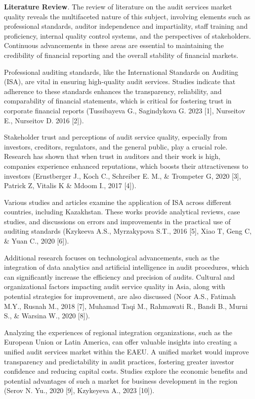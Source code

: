 \begin{multicols}{2}
\textbf{Literature Review}\emph{.} The review of literature on the audit
services market quality reveals the multifaceted nature of this subject,
involving elements such as professional standards, auditor independence
and impartiality, staff training and proficiency, internal quality
control systems, and the perspectives of stakeholders. Continuous
advancements in these areas are essential to maintaining the credibility
of financial reporting and the overall stability of financial markets.

Professional auditing standards, like the International Standards on
Auditing (ISA), are vital in ensuring high-quality audit services.
Studies indicate that adherence to these standards enhances the
transparency, reliability, and comparability of financial statements,
which is critical for fostering trust in corporate financial reports
(Tussibayeva G., Sagindykova G. 2023 {[}1{]}, Nurseitov E., Nurseitov D.
2016 {[}2{]}).

Stakeholder trust and perceptions of audit service quality, especially
from investors, creditors, regulators, and the general public, play a
crucial role. Research has shown that when trust in auditors and their
work is high, companies experience enhanced reputations, which boosts
their attractiveness to investors (Ernstberger J., Koch C., Schreiber E.
M., \& Trompeter G, 2020 {[}3{]}, Patrick Z, Vitalis K \& Mdoom I., 2017
{[}4{]}).

Various studies and articles examine the application of ISA across
different countries, including Kazakhstan. These works provide
analytical reviews, case studies, and discussions on errors and
improvements in the practical use of auditing standards (Kzykeeva A.S.,
Myrzakypova S.T., 2016 {[}5{]}, Xiao T, Geng C, \& Yuan C., 2020
{[}6{]}).

Additional research focuses on technological advancements, such as the
integration of data analytics and artificial intelligence in audit
procedures, which can significantly increase the efficiency and
precision of audits. Cultural and organizational factors impacting audit
service quality in Asia, along with potential strategies for
improvement, are also discussed (Noor A.S., Fatimah M.Y., Rusnah M.,
2018 {[}7{]}, Muhamad Taqi M., Rahmawati R., Bandi B., Murni S., \&
Warsina W., 2020 {[}8{]}).

Analyzing the experiences of regional integration organizations, such as
the European Union or Latin America, can offer valuable insights into
creating a unified audit services market within the EAEU. A unified
market would improve transparency and predictability in audit practices,
fostering greater investor confidence and reducing capital costs.
Studies explore the economic benefits and potential advantages of such a
market for business development in the region (Serov N. Yu., 2020
{[}9{]}, Kzykeyeva A., 2023 {[}10{]}).


\end{multicols}
